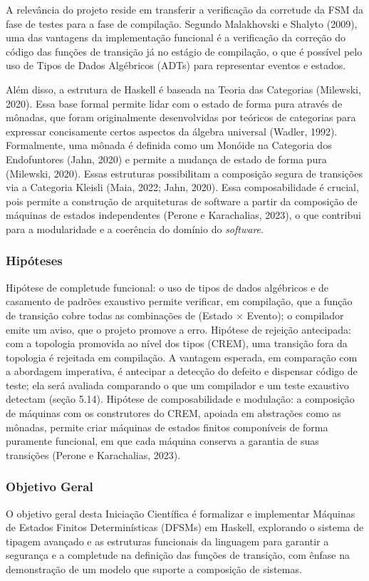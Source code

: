 \documentclass[12pt,a4paper]{article}
\begin{document}
A relevância do projeto reside em transferir a verificação da corretude da FSM da fase de testes para a fase de compilação. Segundo Malakhovski e Shalyto (2009), uma das vantagens da implementação funcional é a verificação da correção do código das funções de transição já no estágio de compilação, o que é possível pelo uso de Tipos de Dados Algébricos (ADTs) para representar eventos e estados.

Além disso, a estrutura de Haskell é baseada na Teoria das Categorias (Milewski, 2020). Essa base formal permite lidar com o estado de forma pura através de mônadas, que foram originalmente desenvolvidas por teóricos de categorias para expressar concisamente certos aspectos da álgebra universal (Wadler, 1992). Formalmente, uma mônada é definida como um Monóide na Categoria dos Endofuntores (Jahn, 2020) e permite a mudança de estado de forma pura (Milewski, 2020). Essas estruturas possibilitam a composição segura de transições via a Categoria Kleisli (Maia, 2022; Jahn, 2020). Essa composabilidade é crucial, pois permite a construção de arquiteturas de software a partir da composição de máquinas de estados independentes (Perone e Karachalias, 2023), o que contribui para a modularidade e a coerência do domínio do \textit{software}.

\subsubsection{Hipóteses}
Hipótese de completude funcional: o uso de tipos de dados algébricos e de casamento de padrões exaustivo permite verificar, em compilação, que a função de transição cobre todas as combinações de (Estado $\times$ Evento); o compilador emite um aviso, que o projeto promove a erro. Hipótese de rejeição antecipada: com a topologia promovida ao nível dos tipos (CREM), uma transição fora da topologia é rejeitada em compilação. A vantagem esperada, em comparação com a abordagem imperativa, é antecipar a detecção do defeito e dispensar código de teste; ela será avaliada comparando o que um compilador e um teste exaustivo detectam (seção 5.14). Hipótese de composabilidade e modulação: a composição de máquinas com os construtores do CREM, apoiada em abstrações como as mônadas, permite criar máquinas de estados finitos componíveis de forma puramente funcional, em que cada máquina conserva a garantia de suas transições (Perone e Karachalias, 2023).

\subsubsection{Objetivo Geral}
O objetivo geral desta Iniciação Científica é formalizar e implementar Máquinas de Estados Finitos Determinísticas (DFSMs) em Haskell, explorando o sistema de tipagem avançado e as estruturas funcionais da linguagem para garantir a segurança e a completude na definição das funções de transição, com ênfase na demonstração de um modelo que suporte a composição de sistemas.
\end{document}
